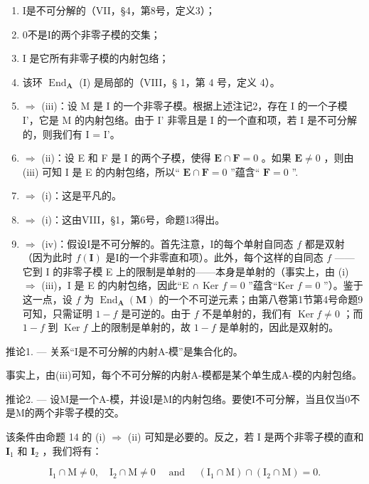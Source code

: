 \begin{enumerate}
\def\labelenumi{(\roman{enumi})}
\item
  I是不可分解的（VII，§4，第8号，定义3）；
\item
  0不是I的两个非零子模的交集；
\item
  I 是它所有非零子模的内射包络；
\item
  该环 \(\operatorname{End}_{\mathbf{A}}\) (I) 是局部的（VIII，§ 1，第 4 号，定义 4）。
\item
  \(\Rightarrow\) (iii)：设 M 是 I 的一个非零子模。根据上述注记2，存在 I 的一个子模 I'，它是 M 的内射包络。由于 I' 非零且是 I 的一个直和项，若 I 是不可分解的，则我们有 I = I'。
\item
  \(\Rightarrow\) (ii)：设 E 和 F 是 I 的两个子模，使得 \(\mathbf{E} \cap \mathbf{F} = 0\) 。如果 \(\mathbf{E} \neq 0\) ，则由 (iii) 可知 I 是 E 的内射包络，所以“ \(\mathbf{E} \cap \mathbf{F} = 0\) ”蕴含“ \(\mathbf{F} = 0\) ”.
\item
  \(\Rightarrow\) (i)：这是平凡的。
\item
  \(\Rightarrow\) (i)：这由VIII，§1，第6号，命题13得出。
\item
  \(\Rightarrow\) (iv)：假设I是不可分解的。首先注意，I的每个单射自同态 \(f\) 都是双射（因为此时 \(f(\mathbf{I})\) 是I的一个非零直和项）。此外，每个这样的自同态 \(f\) ——它到 I 的非零子模 E 上的限制是单射的——本身是单射的（事实上，由 (i) \(\Rightarrow\) (iii)，I 是 E 的内射包络，因此“E ∩ Ker \(f = 0\) ”蕴含“Ker \(f = 0\) ”）。鉴于这一点，设 \(f\) 为 \(\operatorname{End}_{\mathbf{A}}(\mathbf{M})\) 的一个不可逆元素；由第八卷第1节第4号命题9可知，只需证明 \(1 - f\) 是可逆的。由于 \(f\) 不是单射的，我们有 \(\operatorname{Ker} f \neq 0\) ；而 \(1 - f\) 到 \(\operatorname{Ker} f\) 上的限制是单射的，故 \(1 - f\) 是单射的，因此是双射的。
\end{enumerate}

推论1. --- 关系“I是不可分解的内射A-模”是集合化的。

事实上，由(iii)可知，每个不可分解的内射A-模都是某个单生成A-模的内射包络。

推论2. --- 设M是一个A-模，并设I是M的内射包络。要使I不可分解，当且仅当0不是M的两个非零子模的交。

该条件由命题 14 的 (i) \(\Rightarrow\) (ii) 可知是必要的。反之，若 I 是两个非零子模的直和 \(\mathbf{I}_1\) 和 \(\mathbf{I}_2\) ，我们将有：

\[
\mathrm{I} _ {1} \cap \mathrm{M} \neq 0, \quad \mathrm{I} _ {2} \cap \mathrm{M} \neq 0 \quad \text { and } \quad (\mathrm{I} _ {1} \cap \mathrm{M}) \cap (\mathrm{I} _ {2} \cap \mathrm{M}) = 0.
\]

